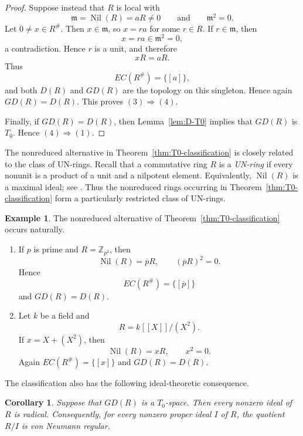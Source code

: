 \documentclass[11pt]{amsart}
\theoremstyle{plain}
\newtheorem{corollary}[theorem]{Corollary}
\theoremstyle{definition}
\newtheorem{example}[theorem]{Example}
\theoremstyle{remark}
\numberwithin{equation}{section}
\begin{document}
\begin{proof}
	Suppose instead that $R$ is local with
	\[
	\mathfrak m=\operatorname{Nil}(R)=aR\neq0
	\qquad\text{and}\qquad
	\mathfrak m^2=0.
	\]
	Let $0\neq x\in R^\#$. Then $x\in\mathfrak m$, so $x=ra$ for some
	$r\in R$. If $r\in\mathfrak m$, then
	\[
	x=ra\in\mathfrak m^2=0,
	\]
	a contradiction. Hence $r$ is a unit, and therefore
	\[
	xR=aR.
	\]
	Thus
	\[
	EC(R^\#)=\{[a]\},
	\]
	and both $D(R)$ and $GD(R)$ are the topology on this singleton. Hence
	again $GD(R)=D(R)$. This proves $(3)\Rightarrow(4)$.
	
	Finally, if $GD(R)=D(R)$, then Lemma~\ref{lem:D-T0} implies that
	$GD(R)$ is $T_0$. Hence $(4)\Rightarrow(1)$.
\end{proof}


The nonreduced alternative in Theorem~\ref{thm:T0-classification} is
closely related to the class of UN-rings. Recall that a commutative ring
$R$ is a \emph{UN-ring} if every nonunit is a product of a unit and a
nilpotent element. Equivalently, $\operatorname{Nil}(R)$ is a maximal
ideal; see \cite{Calug,Mimouni}. Thus the nonreduced rings occurring in
Theorem~\ref{thm:T0-classification} form a particularly restricted class
of UN-rings.

\begin{example}\label{ex:square-zero-local}
	The nonreduced alternative of Theorem~\ref{thm:T0-classification}
	occurs naturally.
	\begin{enumerate}
		\item If $p$ is prime and $R=\mathbb Z_{p^2}$, then
		\[
		\operatorname{Nil}(R)=\overline pR,
		\qquad
		(\overline pR)^2=0.
		\]
		Hence
		\[
		EC(R^\#)=\{[\overline p]\}
		\]
		and $GD(R)=D(R)$.
		
		\item Let $k$ be a field and
		\[
		R=k[[X]]/(X^2).
		\]
		If $x=X+(X^2)$, then
		\[
		\operatorname{Nil}(R)=xR,
		\qquad
		x^2=0.
		\]
		Again $EC(R^\#)=\{[x]\}$ and $GD(R)=D(R)$.
	\end{enumerate}
\end{example}


The classification also has the following ideal-theoretic consequence.

\begin{corollary}\label{cor:radical-ideals}
	Suppose that $GD(R)$ is a $T_0$-space. Then every nonzero ideal of $R$
	is radical. Consequently, for every nonzero proper ideal $I$ of $R$,
	the quotient $R/I$ is von Neumann regular.
\end{corollary}
\end{document}
